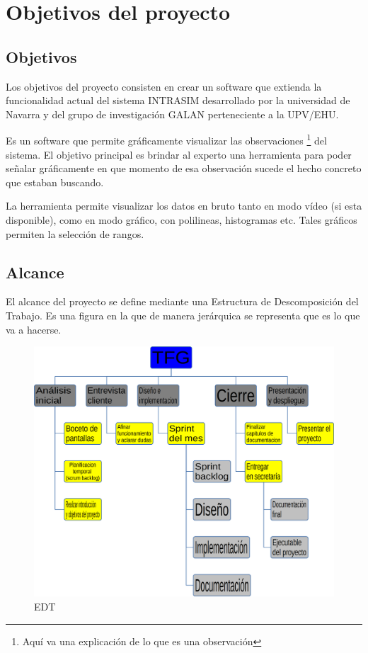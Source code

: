 \chapter{Objetivos del proyecto}


\section{Objetivos}
Los objetivos del proyecto consisten en crear un software que extienda la funcionalidad actual del sistema INTRASIM desarrollado 
por la universidad de Navarra y del grupo de investigación GALAN perteneciente a la UPV/EHU.

Es un software que permite gráficamente visualizar las observaciones \footnote{Aquí va una explicación de lo que es una observación} del sistema.
El objetivo principal es brindar al experto una herramienta para poder señalar gráficamente en que momento de esa 
observación sucede el hecho concreto que estaban buscando.

La herramienta permite visualizar los datos en bruto tanto en modo v\'{i}deo (si esta disponible), como en modo gr\'{a}fico, con polilineas, histogramas etc. Tales gráficos permiten la selección de rangos.

\section{Alcance}
El alcance del proyecto se define mediante una Estructura de Descomposición del Trabajo. Es una figura en la que de manera jer\'{a}rquica
se representa que es lo que va a hacerse.
\begin{figure}[H]
    \centering
    \includegraphics[width=0.7\linewidth]{./Figures/EDT}
    \caption[Alcance del proyecto]{EDT}
    \label{fig:Alcance}
\end{figure}

